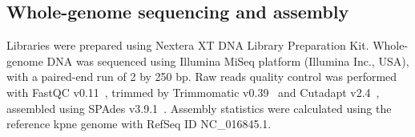 \subsection{Whole-genome sequencing and assembly}\label{subsec:proc_raw}
Libraries were prepared using Nextera XT DNA Library Preparation Kit.
Whole-genome DNA was sequenced using Illumina MiSeq platform (Illumina Inc., USA),
with a paired-end run of 2 by 250 bp.
Raw reads quality control was performed with FastQC v0.11~\cite{FastQC},  %
trimmed by Trimmomatic v0.39~\cite{Trimmomatic}
and Cutadapt v2.4~\cite{Cutadapt},
assembled using SPAdes v3.9.1~\cite{SPAdes}.
Assembly statistics were calculated using the reference \gls{kpne} genome with RefSeq ID NC\_016845.1.

